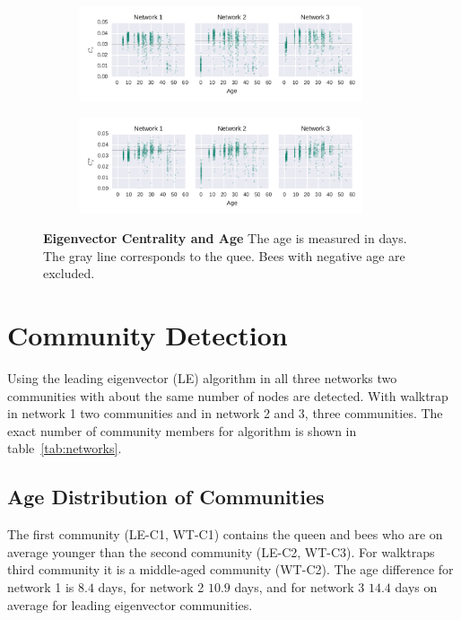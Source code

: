 \begin{figure}[htb]
	\centering
	\begin{subfigure}[b]{1.0\textwidth}
	\centering
	\includegraphics[width=0.92\textwidth]{Figures/stat-evcAge}
	\label{fig:evcAgeUW}
	\end{subfigure} 
	\begin{subfigure}[b]{1.0\textwidth}
	\centering
	\includegraphics[width=0.92\textwidth]{Figures/stat-evcWAge}
	\label{fig:evcAgeW}
	\end{subfigure}
	\caption[Eigenvector Centrality and Age]{\textbf{Eigenvector Centrality and Age} The age is measured in days. The gray line corresponds to the quee. Bees with negative age are excluded.}
	\label{fig:evcAge}
\end{figure}

\clearpage
\section{Community Detection}

Using the leading eigenvector (LE) algorithm in all three networks two communities with about the same number of nodes are detected. With walktrap in network 1 two communities and in network 2 and 3, three communities. The exact number of community members for algorithm is shown in table~\ref{tab:networks}.

\subsection{Age Distribution of Communities}
The first community (LE-C1, WT-C1) contains the queen and bees who are on average younger than the second community (LE-C2, WT-C3). For walktraps third community it is a middle-aged community (WT-C2). The age difference for network 1 is $8.4$ days, for network 2 $10.9$ days, and for network 3 $14.4$ days on average for leading eigenvector communities.

